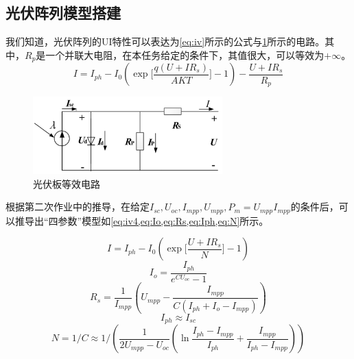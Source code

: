 \documentclass[a4paper,12pt]{article}
\begin{document}
    \subsection{光伏阵列模型搭建} %
    \label{sub:光伏阵列模型搭建}
    我们知道，光伏阵列的UI特性可以表达为\cref{eq:iv}所示的公式与\cref{fig:pv}所示的电路。其中，$R_p$是一个并联大电阻，在本任务给定的条件下，其值很大，可以等效为$+\infty$。
    \begin{equation}
        I=I_{ph}-I_0 (\exp{[\frac{q(U+I R_s)}{AKT}}]-1)-\frac{U+I R_s}{R_p}
        \label{eq:iv}
    \end{equation}
    \begin{figure}[htbp]
        \centering
        \includegraphics[width=0.65\textwidth]{pv.png}
        \caption{光伏板等效电路}
        \label{fig:pv}
    \end{figure}    
    根据第二次作业中的推导，在给定$I_{sc},U_{oc},I_{mpp},U_{mpp},P_m=U_{mpp}I_{mpp}$的条件后，可以推导出“四参数”模型如\cref{eq:iv4,eq:Io,eq:Rs,eq:Iph,eq:N}所示。

    \begin{equation}
        I=I_{ph}-I_0 (\exp{[\frac{U+I R_s}{N}}]-1)
        \label{eq:iv4}
    \end{equation}
    \begin{equation}\label{eq:Io}
          I_o=\displaystyle\frac{I_{ph}}{e^{CU_{oc}}-1}
    \end{equation}
    \begin{equation}\label{eq:Rs}
          R_s=\displaystyle\frac{1}{I_{mpp}}\left(U_{mpp}-\displaystyle\frac{I_{mpp}}{C\left(I_{ph}+I_o-I_{mpp}\right)}\right)
    \end{equation}
    \begin{equation}\label{eq:Iph}
          I_{ph}\approx I_{sc}
    \end{equation}
    \begin{equation}\label{eq:N}
          N=1/C\approx\displaystyle1/(\frac{1}{2U_{mpp}-U_{oc}}\left(\ln\displaystyle\frac{I_{ph}-I_{mpp}}{I_{ph}}+\displaystyle\frac{I_{mpp}}{I_{ph}-I_{mpp}}\right))
    \end{equation}
\end{document}
